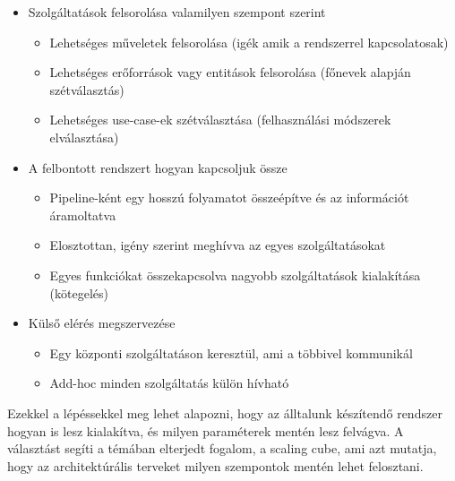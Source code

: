 \documentclass[11pt,magyar,a4paper,oneside,]{report}
\begin{document}
\begin{itemize}
\itemsep1pt\parskip0pt
\item
  Szolgáltatások felsorolása valamilyen szempont szerint

  \begin{itemize}
  \itemsep1pt\parskip0pt
  \item
    Lehetséges műveletek felsorolása (igék amik a rendszerrel
    kapcsolatosak)
  \item
    Lehetséges erőforrások vagy entitások felsorolása (főnevek alapján
    szétválasztás)
  \item
    Lehetséges use-case-ek szétválasztása (felhasználási módszerek
    elválasztása)
  \end{itemize}
\item
  A felbontott rendszert hogyan kapcsoljuk össze

  \begin{itemize}
  \itemsep1pt\parskip0pt
  \item
    Pipeline-ként egy hosszú folyamatot összeépítve és az információt
    áramoltatva
  \item
    Elosztottan, igény szerint meghívva az egyes szolgáltatásokat
  \item
    Egyes funkciókat összekapcsolva nagyobb szolgáltatások kialakítása
    (kötegelés)
  \end{itemize}
\item
  Külső elérés megszervezése

  \begin{itemize}
  \itemsep1pt\parskip0pt
  \item
    Egy központi szolgáltatáson keresztül, ami a többivel kommunikál
  \item
    Add-hoc minden szolgáltatás külön hívható
  \end{itemize}
\end{itemize}

Ezekkel a lépéssekkel meg lehet alapozni, hogy az álltalunk készítendő
rendszer hogyan is lesz kialakítva, és milyen paraméterek mentén lesz
felvágva. A választást segíti a témában elterjedt fogalom, a scaling
cube\citep{scale-cube}, ami azt mutatja, hogy az architektúrális
terveket milyen szempontok mentén lehet felosztani.
\end{document}
